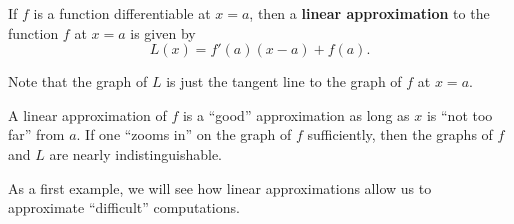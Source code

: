\documentclass{ximera}
\begin{document}
\begin{definition}
If $f$ is a function differentiable at $x=a$, then a \textbf{linear
  approximation} to the function $f$ at $x=a$ is given by
\[
L(x) = f'(a)(x-a) +f(a).
\]
\end{definition}


Note that the graph of $L$ is just the tangent line to the graph of $f$ at $x=a$.

A linear approximation of $f$ is a ``good'' approximation as long as
$x$ is ``not too far'' from $a$.
If one ``zooms in'' on the graph of $f$ sufficiently, then the graphs of $f$ and $L$ 
 are nearly indistinguishable.
 
  As a first example, we
will see how linear approximations allow us to approximate
``difficult'' computations.
\end{document}
